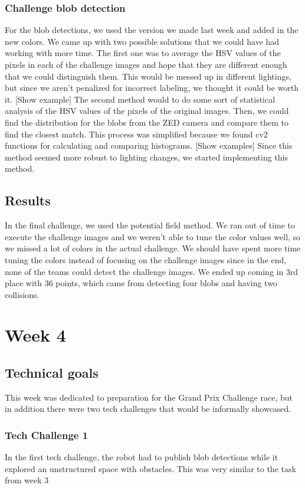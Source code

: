 \documentclass[journal, a4paper]{IEEEtran}
\begin{document}
\subsubsection{Challenge blob detection} For the blob detections, we used the version we made last week and added in the new colors. We came up with two possible solutions that we could have had working with more time. The first one was to average the HSV values of the pixels in each of the challenge images and hope that they are different enough that we could distinguish them. This would be messed up in different lightings, but since we aren’t penalized for incorrect labeling, we thought it could be worth it. [Show example] The second method would to do some sort of statistical analysis of the HSV values of the pixels of the original images. Then, we could find the distribution for the blobs from the ZED camera and compare them to find the closest match. This process was simplified because we found cv2 functions for calculating and comparing histograms. [Show examples] Since this method seemed more robust to lighting changes, we started implementing this method. 
\subsection{Results}
In the final challenge, we used the potential field method. We ran out of time to execute the challenge images and we weren’t able to tune the color values well, so we missed a lot of colors in the actual challenge. We should have spent more time tuning the colors instead of focusing on the challenge images since in the end, none of the teams could detect the challenge images. We ended up coming in 3rd place with 36 points, which came from detecting four blobs and having two collisions. 

\section{Week 4}
\subsection{Technical goals}
This week was dedicated to preparation for the Grand Prix Challenge race, but in addition there were two tech challenges that would be informally showcased. 
\subsubsection{Tech Challenge 1}
In the first tech challenge, the robot had to publish blob detections while it explored an unstructured space with obstacles. This was very similar to the task from week 3
\end{document}
